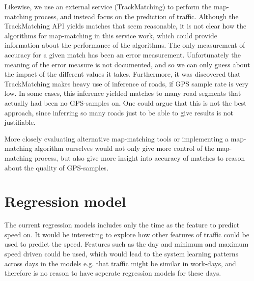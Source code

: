Likewise, we use an external service (TrackMatching) to perform the map-matching process, and instead focus on the prediction of traffic. Although the TrackMatching API yields matches that seem reasonable, it is not clear how the algorithms for map-matching in this service work, which could provide information about the performance of the algorithms. The only measurement of accuracy for a given match has been an error measurement. Unfortunately the meaning of the error measure is not documented, and so we can only guess about the impact of the different values it takes. Furthermore, it was discovered that TrackMatching makes heavy use of inference of roads, if GPS sample rate is very low. In some cases, this inference yielded matches to many road segments that actually had been no GPS-samples on. One could argue that this is not the best approach, since inferring so many roads just to be able to give results is not justifiable.

More closely evaluating alternative map-matching tools or implementing a map-matching algorithm ourselves would not only give more control of the map-matching process, but also give more insight into accuracy of matches to reason about the quality of GPS-samples.


\section{Regression model}
The current regression models includes only the time as the feature to predict speed on. It would be interesting to explore how other features of traffic could be used to predict the speed. Features such as the day and minimum and maximum speed driven could be used, which would lead to the system learning patterns across days in the models e.g.  that traffic might be similar in work-days, and therefore is no reason to have seperate regression models for these days. 

